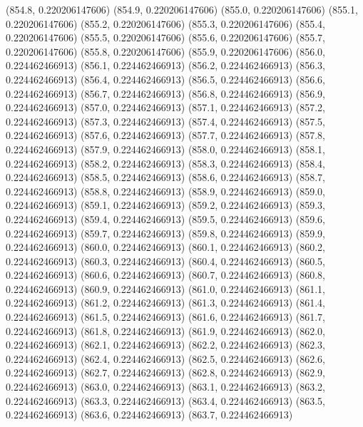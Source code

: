 {					(854.8, 0.220206147606)
					(854.9, 0.220206147606)
					(855.0, 0.220206147606)
					(855.1, 0.220206147606)
					(855.2, 0.220206147606)
					(855.3, 0.220206147606)
					(855.4, 0.220206147606)
					(855.5, 0.220206147606)
					(855.6, 0.220206147606)
					(855.7, 0.220206147606)
					(855.8, 0.220206147606)
					(855.9, 0.220206147606)
					(856.0, 0.224462466913)
					(856.1, 0.224462466913)
					(856.2, 0.224462466913)
					(856.3, 0.224462466913)
					(856.4, 0.224462466913)
					(856.5, 0.224462466913)
					(856.6, 0.224462466913)
					(856.7, 0.224462466913)
					(856.8, 0.224462466913)
					(856.9, 0.224462466913)
					(857.0, 0.224462466913)
					(857.1, 0.224462466913)
					(857.2, 0.224462466913)
					(857.3, 0.224462466913)
					(857.4, 0.224462466913)
					(857.5, 0.224462466913)
					(857.6, 0.224462466913)
					(857.7, 0.224462466913)
					(857.8, 0.224462466913)
					(857.9, 0.224462466913)
					(858.0, 0.224462466913)
					(858.1, 0.224462466913)
					(858.2, 0.224462466913)
					(858.3, 0.224462466913)
					(858.4, 0.224462466913)
					(858.5, 0.224462466913)
					(858.6, 0.224462466913)
					(858.7, 0.224462466913)
					(858.8, 0.224462466913)
					(858.9, 0.224462466913)
					(859.0, 0.224462466913)
					(859.1, 0.224462466913)
					(859.2, 0.224462466913)
					(859.3, 0.224462466913)
					(859.4, 0.224462466913)
					(859.5, 0.224462466913)
					(859.6, 0.224462466913)
					(859.7, 0.224462466913)
					(859.8, 0.224462466913)
					(859.9, 0.224462466913)
					(860.0, 0.224462466913)
					(860.1, 0.224462466913)
					(860.2, 0.224462466913)
					(860.3, 0.224462466913)
					(860.4, 0.224462466913)
					(860.5, 0.224462466913)
					(860.6, 0.224462466913)
					(860.7, 0.224462466913)
					(860.8, 0.224462466913)
					(860.9, 0.224462466913)
					(861.0, 0.224462466913)
					(861.1, 0.224462466913)
					(861.2, 0.224462466913)
					(861.3, 0.224462466913)
					(861.4, 0.224462466913)
					(861.5, 0.224462466913)
					(861.6, 0.224462466913)
					(861.7, 0.224462466913)
					(861.8, 0.224462466913)
					(861.9, 0.224462466913)
					(862.0, 0.224462466913)
					(862.1, 0.224462466913)
					(862.2, 0.224462466913)
					(862.3, 0.224462466913)
					(862.4, 0.224462466913)
					(862.5, 0.224462466913)
					(862.6, 0.224462466913)
					(862.7, 0.224462466913)
					(862.8, 0.224462466913)
					(862.9, 0.224462466913)
					(863.0, 0.224462466913)
					(863.1, 0.224462466913)
					(863.2, 0.224462466913)
					(863.3, 0.224462466913)
					(863.4, 0.224462466913)
					(863.5, 0.224462466913)
					(863.6, 0.224462466913)
					(863.7, 0.224462466913)
}
